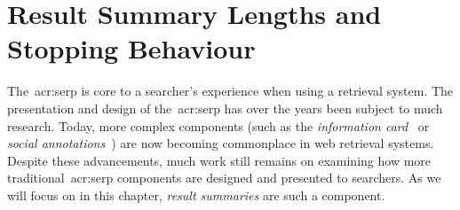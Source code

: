 
\chapter[Result Summary Lengths and Stopping Behaviour]{Result Summary Lengths and\\Stopping Behaviour}\label{chap:snippets}

The~\gls{acr:serp} is core to a searcher's experience when using a retrieval system. The presentation and design of the~\gls{acr:serp} has over the years been subject to much research. Today, more complex components (such as the \emph{information card}~\citep{navalpakkam2013non_linear_serp} or \emph{social annotations}~\citep{muralidharan2012social_annotations}) are now becoming commonplace in web retrieval systems. Despite these advancements, much work still remains on examining how more traditional~\gls{acr:serp} components are designed and presented to searchers. As we will focus on in this chapter, \emph{result summaries} are such a component.


\begin{figure}[h]
    \centering
    \vspace{4mm}
    \label{fig:serpintro}
    \vspace{-5mm}
\end{figure}

